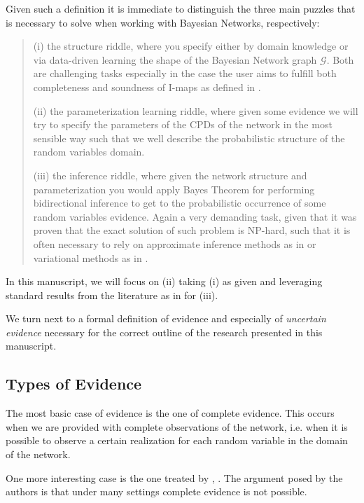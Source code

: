 \documentclass[11pt]{article}
\begin{document}
\begin{article}
Given such a definition it is immediate to distinguish the three
main puzzles that is necessary to solve when working with Bayesian
Networks, respectively:

\begin{quote}
(i) the structure riddle, where you specify either by domain knowledge
or via data-driven learning the shape of the Bayesian Network graph
\(\mathscr{G}\). Both are challenging tasks especially in the case
the user aims to fulfill both completeness and soundness of I-maps
as defined in \cite{koller2009probabilistic}.

(ii) the parameterization learning riddle, where given some
evidence we will try to specify the parameters of the CPDs of the
network in the most sensible way such that we well describe the
probabilistic structure of the random variables domain.

(iii) the inference riddle, where given the network structure and
parameterization you would apply Bayes Theorem for performing
bidirectional inference to get to the probabilistic occurrence of
some random variables evidence. Again a very demanding task, given
that it was proven that the exact solution of such problem is NP-hard,
such that it is often necessary to rely on approximate inference
methods as in \cite{pearl1987evidential} or variational methods as in
\cite{jordan1999introduction}.
\end{quote}


In this manuscript, we will focus on (ii) taking (i) as given and
leveraging standard results from the literature as in
\cite{koller2009probabilistic} for (iii).

We turn next to a formal definition of evidence and especially of
\emph{uncertain evidence} necessary for the correct outline of the
research presented in this manuscript.

\subsection{Types of Evidence}
\label{sec:org1397775}

The most basic case of evidence is the one of complete
evidence. This occurs when we are provided with complete
observations of the network, i.e.  when it is possible to observe a
certain realization for each random variable in the domain of the
network.

One more interesting case is the one treated by \cite{Mrad_2015},
\cite{Wasserkrug_all}. The argument posed by the authors is that under
many settings complete evidence is not possible.


\end{article}
\end{document}
